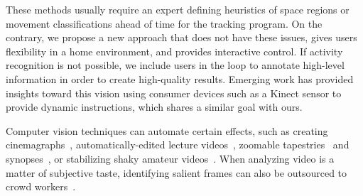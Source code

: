 These methods usually require an expert defining heuristics of space regions or movement classifications ahead of time for the tracking program.
%
On the contrary, we propose a new approach that does not have these issues, gives users flexibility in a home environment, and provides interactive control. If activity recognition is not possible, we include users in the loop to annotate high-level information in order to create high-quality results.
%
Emerging work has provided insights toward this vision using consumer devices such as a Kinect sensor \cite{Anderson:2013:YEM:2501988.2502045,Gupta:2012ku} to provide dynamic instructions, which shares a similar goal with ours.




Computer vision techniques can automate certain effects, such as creating cinemagraphs~\cite{Bai:2012, Joshi:2012}, automatically-edited lecture videos~\cite{Heck:2007}, zoomable tapestries~\cite{Barnes:2010} and synopses~\cite{Pritch:2009vl}, or stabilizing shaky amateur videos~\cite{Liu:2011}. When analyzing video is a matter of subjective taste, identifying salient frames can also be outsourced to crowd workers~\cite{Bernstein:2011uj}.


